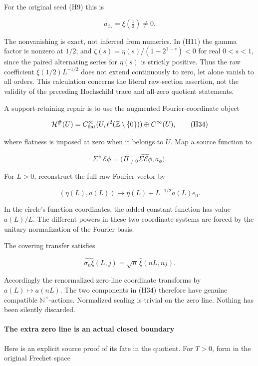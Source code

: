 For the original seed (H9) this is

\[
\boxed{a_{\phi_*}=\xi(\tfrac12)\ne0.}
\tag{H33}
\]

The nonvanishing is exact, not inferred from numerics. In (H11) the gamma factor is nonzero at \(1/2\); and \(\zeta(s)=\eta(s)/(1-2^{1-s})<0\) for real \(0<s<1\), since the paired alternating series for \(\eta(s)\) is strictly positive. Thus the raw coefficient \(\xi(1/2)L^{-1/2}\) does not extend continuously to zero, let alone vanish to all orders. This calculation concerns the literal raw-section assertion, not the validity of the preceding Hochschild trace and all-zero quotient statements.

A support-retaining repair is to use the augmented Fourier-coordinate object

\[
\mathcal H^\#(U)=C^\infty_{\rm flat}(U,\ell^2(\mathbb Z\setminus\{0\}))\oplus C^\infty(U),
\tag{H34}
\]

where flatness is imposed at zero when it belongs to \(U\). Map a source function to

\[
\Sigma^\#\mathcal E\phi=
\bigl(\Pi_{\ne0}\widehat{\Sigma\mathcal E\phi},a_\phi\bigr).
\tag{H35}
\]

For \(L>0\), reconstruct the full raw Fourier vector by

\[
(\eta(L),a(L))\longmapsto\eta(L)+L^{-1/2}a(L)e_0.
\tag{H36}
\]

In the circle's function coordinates, the added constant function has value \(a(L)/L\). The different powers in these two coordinate systems are forced by the unitary normalization of the Fourier basis.

The covering transfer satisfies

\[
\widehat{\sigma_n\xi}(L,j)=\sqrt n\,\widehat\xi(nL,nj).
\tag{H37}
\]

Accordingly the renormalized zero-line coordinate transforms by \(a(L)\mapsto a(nL)\). The two components in (H34) therefore have genuine compatible \(\mathbb N^\times\)-actions. Normalized scaling is trivial on the zero line. Nothing has been silently discarded.

\paragraph{The extra zero line is an actual closed boundary}\label{endpoint-cc_hochschild--the-extra-zero-line-is-an-actual-closed-boundary}

Here is an explicit source proof of its fate in the quotient. For \(T>0\), form in the original Frechet space

